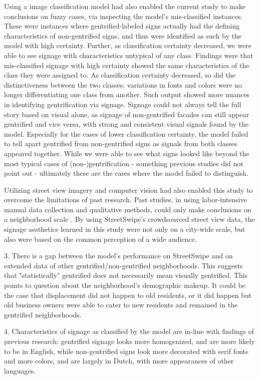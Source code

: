 Using a image classification model had also enabled the current study to make conclusions on fuzzy cases, via inspecting the model's mis-classified instances. These were instances where gentrified-labeled signs actually had the defining characteristics of non-gentrified signs, and thus were identified as such by the model with high certainty. Further, as classification certainty decreased, we were able to see signage with characteristics untypical of any class. Findings were that mis-classified signage with high certainty showed the same characteristics of the class they were assigned to. As classification certainty decreased, so did the distinctiveness between the two classes: variations in fonts and colors were no longer differentiating one class from another. Such output showed more nuances in identifying gentrification via signage. Signage could not always tell the full story based on visual alone, as signage of non-gentrified facades can still appear gentrified and vice versa, with strong and consistent visual signals found by the model. Especially for the cases of lower classification certainty, the model failed to tell apart gentrified from non-gentrified signs as signals from both classes appeared together. While we were able to see what signs looked like  beyond the most typical cases of (non-)gentrification - something previous studies did not point out - ultimately these are the cases where the model failed to distinguish. 


Utilizing street view imagery and computer vision had also enabled this study to overcome the limitations of past research. Past studies, in using labor-intensive manual data collection and qualitative methods, could only make conclusions on a neighborhood scale \cite{reades_understanding_2019, barton_exploration_2016}. By using StreetSwipe's crowdsourced street view data, the signage aesthetics learned in this study were not only on a city-wide scale, but also were based on the common perception of a wide audience.

3. There is a gap between the model's performance on StreetSwipe and on extended data of other gentrified/non-gentrified neighborhoods. This suggests that "statistically" gentrified does not necessarily mean visually gentrified. This points to question about the neighborhood's demographic makeup. It could be the case that displacement did not happen to old residents, or it did happen but old business owners were able to cater to new residents and remained in the gentrified neighborhoods.

4. Characteristics of signage as classified by the model are in-line with findings of previous research: gentrified signage looks more homogenized, and are more likely to be in English, while non-gentrified signs look more decorated with serif fonts and more colors, and are largely in Dutch, with more appearances of other languages.

